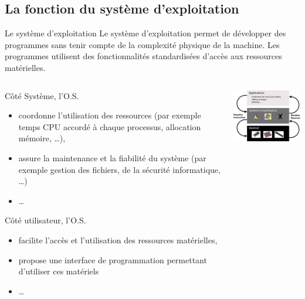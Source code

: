 \subsection{La fonction du système d'exploitation}
\begin{frame}{Le système d'exploitation}
  Le système d'exploitation permet de développer des programmes sans
  tenir compte de la complexité physique de la machine. Les programmes
  utilisent des fonctionnalités standardisées d'accès aux ressources
  matérielles.
  \begin{columns}
    \begin{column}{5.5cm}
      \begin{block}{Côté Système, l'O.S.}
        \begin{itemize}
        \item coordonne l'utilisation des ressources (par exemple temps CPU
          accordé à chaque processus, allocation mémoire, \dots),
        \item assure la maintenance et la fiabilité du système (par exemple
          gestion des fichiers, de la sécurité informatique, \dots)
        \item \dots
        \end{itemize}
      \end{block}
      \begin{block}{Côté utilisateur, l'O.S.}
        \begin{itemize}
        \item facilite l'accès et l'utilisation des ressources
          matérielles,
        \item propose une interface de programmation permettant
          d'utiliser ces matériels
        \item \dots
        \end{itemize}
      \end{block}
    \end{column}
    \begin{column}{6cm}
      \begin{center}
        \includegraphics[width=6cm]{img/s01/OS_interface_2.jpg}
      \end{center}
    \end{column}
  \end{columns}
\end{frame}

